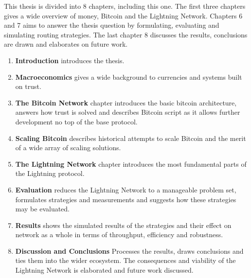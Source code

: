 This thesis is divided into 8 chapters, including this one. The first three chapters gives a wide overview of money, Bitcoin and the \gls{Lightning Network}. Chapters 6 and 7 aims to answer the thesis question by formulating, evaluating and simulating routing strategies. The last chapter 8 discusses the results, conclusions are drawn and elaborates on future work.

\begin{enumerate}
	\item \textbf{Introduction} introduces the thesis.
	\item \textbf{Macroeconomics} gives a wide background to currencies and systems built on trust. 
	\item \textbf{The Bitcoin Network} chapter introduces the basic \gls{bitcoin} architecture, answers how trust is solved and describes Bitcoin script as it allows further development no top of the base protocol.
	\item \textbf{Scaling Bitcoin} describes historical attempts to scale Bitcoin and the merit of a wide array of scaling solutions.
	\item \textbf{The \gls{Lightning Network}} chapter introduces the most fundamental parts of the Lightning protocol.
	\item \textbf{Evaluation} reduces the Lightning Network to a manageable problem set, formulates strategies and measurements and suggests how these strategies may be evaluated.
	\item \textbf{Results} shows the simulated results of the strategies and their effect on network as a whole in terms of throughput, efficiency and robustness.
	\item \textbf{Discussion and Conclusions} Processes the results, draws conclusions and ties them into the wider ecosystem. The consequences and viability of the Lightning Network is elaborated and future work discussed.
\end{enumerate}